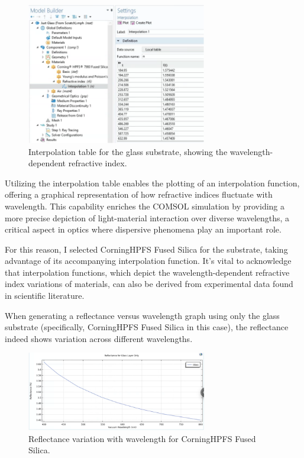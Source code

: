 \begin{figure}[H]
  \centering
  \includegraphics[width=0.7\textwidth]{Chapters/Figures/Chapter 4 Figures/Interpolation Table for Glass Substrate.png}
  \caption{Interpolation table for the glass substrate, showing the wavelength-dependent refractive index.}
  \label{fig:interpolation-table-glass}
\end{figure}

Utilizing the interpolation table enables the plotting of an interpolation function, offering a graphical representation of how refractive indices fluctuate with wavelength. This capability enriches the COMSOL simulation by providing a more precise depiction of light-material interaction over diverse wavelengths, a critical aspect in optics where dispersive phenomena play an important role.

For this reason, I selected Corning\texttrademark \space HPFS\texttrademark {} Fused Silica for the substrate, taking advantage of its accompanying interpolation function. It's vital to acknowledge that interpolation functions, which depict the wavelength-dependent refractive index variations of materials, can also be derived from experimental data found in scientific literature.

When generating a reflectance versus wavelength graph using only the glass substrate (specifically, Corning\texttrademark \space HPFS\texttrademark {} Fused Silica in this case), the reflectance indeed shows variation across different wavelengths.

\begin{figure}[H]
  \centering
  \includegraphics[width=0.7\textwidth]{Chapters/Figures/Chapter 4 Figures/Reflectance (Just Glass).png}
  \caption{Reflectance variation with wavelength for Corning\texttrademark \space HPFS\texttrademark {} Fused Silica.}
  \label{fig:Reflectance-variation-glass}
\end{figure}

